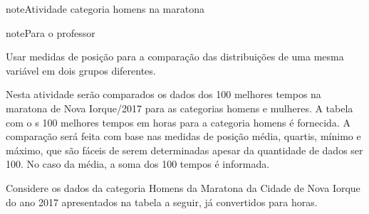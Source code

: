 \practice{ }
\label{\detokenize{PE104-2:sec-praticando1}}\label{\detokenize{PE104-2::doc}}\label{\detokenize{PE104-2:praticando}}\label{\detokenize{PE104-2:ativ-maratona-categoria-homens}}
\begin{sphinxadmonition}{note}{Atividade}{ categoria homens na maratona}

\begin{sphinxadmonition}{note}{Para o professor}

 Usar medidas de posição para a comparação das distribuições de uma mesma variável em dois grupos diferentes.

 Nesta atividade serão comparados os dados dos 100 melhores tempos na maratona de Nova Iorque/2017 para as categorias homens e mulheres. A tabela com o s 100 melhores tempos em horas para a categoria homens é fornecida. A comparação será feita com base nas medidas de posição média, quartis, mínimo e máximo, que são fáceis de serem determinadas apesar da quantidade de dados ser 100. No caso da média, a soma dos 100 tempos é informada.
\end{sphinxadmonition}

Considere os dados da categoria Homens da Maratona da Cidade de Nova Iorque do ano 2017 apresentados na tabela a seguir, já convertidos para horas.



\end{sphinxadmonition}
